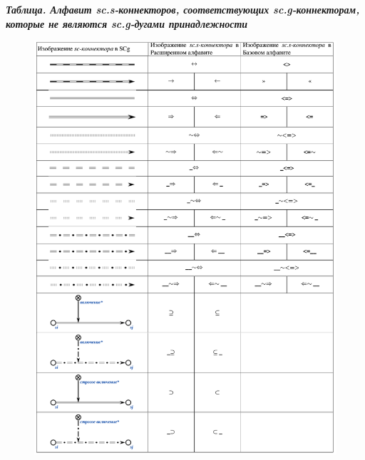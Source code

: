 
\textbf{\textit{Таблица. Алфавит sc.s-коннекторов, соответствующих sc.g-коннекторам, которые не являются sc.g-дугами принадлежности\scnsupergroupsign}}


\begin{figure}[h]
	\centering
	\includegraphics[scale=0.5]{images/intro/scs_non_membership_connectors_1.png}
\end{figure}

